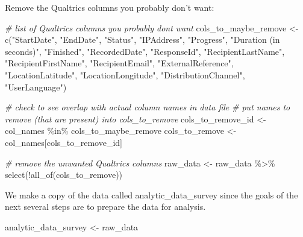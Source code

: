 \documentclass[
]{krantz}
\makeatletter
\newenvironment{Shaded}{\begin{snugshade}}{\end{snugshade}}
\newcommand{\CommentTok}[1]{\textcolor[rgb]{0.37,0.37,0.37}{\textit{#1}}}
\newcommand{\FunctionTok}[1]{\textcolor[rgb]{0,0,0}{#1}}
\newcommand{\NormalTok}[1]{#1}
\newcommand{\OtherTok}[1]{\textcolor[rgb]{0.37,0.37,0.37}{#1}}
\newcommand{\SpecialCharTok}[1]{\textcolor[rgb]{0,0,0}{#1}}
\newcommand{\StringTok}[1]{\textcolor[rgb]{0.5,0.5,0.5}{#1}}
\newenvironment{kframe}{%
\medskip{}
\setlength{\fboxsep}{.8em}
 \def\at@end@of@kframe{}%
 \ifinner\ifhmode%
  \def\at@end@of@kframe{\end{minipage}}%
  \begin{minipage}{\columnwidth}%
 \fi\fi%
 \def\FrameCommand##1{\hskip\@totalleftmargin \hskip-\fboxsep
 \colorbox{shadecolor}{##1}\hskip-\fboxsep
     \hskip-\linewidth \hskip-\@totalleftmargin \hskip\columnwidth}%
 \MakeFramed {\advance\hsize-\width
   \@totalleftmargin\z@ \linewidth\hsize
   \@setminipage}}%
 {\par\unskip\endMakeFramed%
 \at@end@of@kframe}
\renewenvironment{Shaded}{\begin{kframe}}{\end{kframe}}
\makeatother
\begin{document}
Remove the Qualtrics columns you probably don't want:

\begin{Shaded}
\begin{Highlighting}[]
\CommentTok{\# list of Qualtrics columns you probably don\textquotesingle{}t want}
\NormalTok{cols\_to\_maybe\_remove }\OtherTok{\textless{}{-}} \FunctionTok{c}\NormalTok{(}\StringTok{"StartDate"}\NormalTok{,}
                          \StringTok{"EndDate"}\NormalTok{,}
                          \StringTok{"Status"}\NormalTok{,}
                          \StringTok{"IPAddress"}\NormalTok{,}
                          \StringTok{"Progress"}\NormalTok{,}
                          \StringTok{"Duration (in seconds)"}\NormalTok{,}
                          \StringTok{"Finished"}\NormalTok{,}
                          \StringTok{"RecordedDate"}\NormalTok{,}
                          \StringTok{"ResponseId"}\NormalTok{,}
                          \StringTok{"RecipientLastName"}\NormalTok{,}
                          \StringTok{"RecipientFirstName"}\NormalTok{,}
                          \StringTok{"RecipientEmail"}\NormalTok{,}
                          \StringTok{"ExternalReference"}\NormalTok{,}
                          \StringTok{"LocationLatitude"}\NormalTok{,}
                          \StringTok{"LocationLongitude"}\NormalTok{,}
                          \StringTok{"DistributionChannel"}\NormalTok{,}
                          \StringTok{"UserLanguage"}\NormalTok{)}

\CommentTok{\# check to see overlap with actual column names in data file}
\CommentTok{\# put names to remove (that are present) into cols\_to\_remove}
\NormalTok{cols\_to\_remove\_id }\OtherTok{\textless{}{-}}\NormalTok{ col\_names }\SpecialCharTok{\%in\%}\NormalTok{ cols\_to\_maybe\_remove}
\NormalTok{cols\_to\_remove }\OtherTok{\textless{}{-}}\NormalTok{ col\_names[cols\_to\_remove\_id]}

\CommentTok{\# remove the unwanted Qualtrics columns}
\NormalTok{raw\_data }\OtherTok{\textless{}{-}}\NormalTok{ raw\_data }\SpecialCharTok{\%\textgreater{}\%} 
  \FunctionTok{select}\NormalTok{(}\SpecialCharTok{!}\FunctionTok{all\_of}\NormalTok{(cols\_to\_remove))}
\end{Highlighting}
\end{Shaded}

We make a copy of the data called analytic\_data\_survey since the goals of the next several steps are to prepare the data for analysis.

\begin{Shaded}
\begin{Highlighting}[]
\NormalTok{analytic\_data\_survey }\OtherTok{\textless{}{-}}\NormalTok{ raw\_data}
\end{Highlighting}
\end{Shaded}
\end{document}
